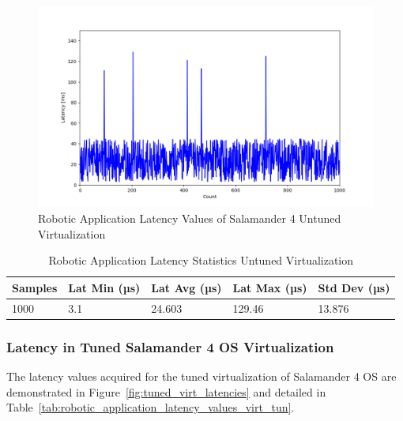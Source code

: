 \documentclass[MMR,Master,english]{style/twbook}
\begin{document}
\begin{figure}[H]
	\centering
	\includegraphics[width=1.0\columnwidth]{img/implementation/untuned_virt_latencies.png}
	\caption[Robotic Application Latency Values of Salamander 4 Untuned Virtualization]{Robotic Application Latency Values of Salamander 4 Untuned Virtualization}
	\label{fig:untuned_virt_latencies}
\end{figure}

\begin{table}[H]
	\centering
	\caption{Robotic Application Latency Statistics Untuned Virtualization}
	\label{tab:robotic_application_latency_values_virt_def}
	\setlength{\tabcolsep}{0.5em} %
	{\renewcommand{\arraystretch}{1.2}%
		\begin{tabular}{|l|l|l|l|l|}
			\hline
			\textbf{Samples} & \textbf{Lat Min (µs)} & \textbf{Lat Avg (µs)} & \textbf{Lat Max (µs)} & \textbf{Std Dev (µs)} \\ \hline
			1000             & 3.1                   & 24.603                & 129.46                & 13.876                \\ \hline
		\end{tabular}}
\end{table}

\clearpage

\subsubsection{Latency in Tuned Salamander 4 OS Virtualization}\label{subsubsec:latency_virtualization}
\noindent The latency values acquired for the tuned virtualization of Salamander 4 OS are demonstrated in Figure~\ref{fig:tuned_virt_latencies} and detailed in Table~\ref{tab:robotic_application_latency_values_virt_tun}.
\end{document}
